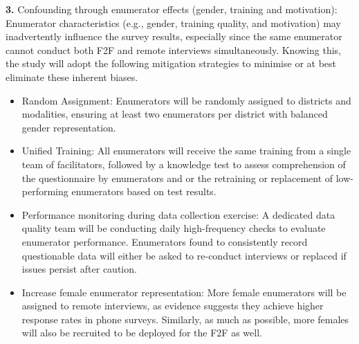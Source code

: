 \documentclass[11pt,harvard]{article}
\begin{document}
	\textbf{3.}	Confounding through enumerator effects (gender, training and motivation): Enumerator characteristics (e.g., gender, training quality, and motivation) may inadvertently influence the survey results, especially since the same enumerator cannot conduct both F2F and remote interviews simultaneously. Knowing this, the study will adopt the following mitigation strategies to minimise or at best eliminate these inherent biases.
	\begin{itemize}
		\item Random Assignment: Enumerators will be randomly assigned to districts and modalities, ensuring at least two enumerators per district with balanced gender representation.
		\item Unified Training: All enumerators will receive the same training from a single team of facilitators, followed by a knowledge test to assess comprehension of the questionnaire by enumerators and or the retraining or replacement of low-performing enumerators based on test results.
		\item Performance monitoring during data collection exercise: A dedicated data quality team will be conducting daily high-frequency checks to evaluate enumerator performance. Enumerators found to consistently record questionable data will either be asked to re-conduct interviews or replaced if issues persist after caution.
		\item Increase female enumerator representation: More female enumerators will be assigned to remote interviews, as evidence suggests they achieve higher response rates in phone surveys. Similarly, as much as possible, more females will also be recruited to be deployed for the F2F as well.
	\end{itemize}
	
\end{document}
